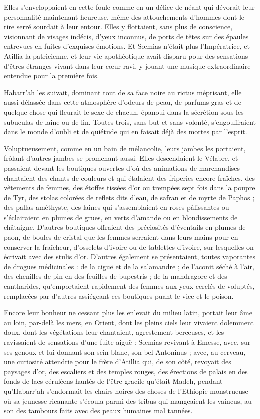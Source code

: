 \documentclass[a4paper, 11pt, oneside, polutonikogreek, french]{article}
\begin{document}
Elles s'enveloppaient en cette foule comme en un délice de néant qui dévorait leur personnalité maintenant heureuse, même des attouchements d'hommes dont le rire serré sourdait à leur entour. Elles y flottaient, sans plus de conscience, visionnant de visages indécis, d'yeux inconnus, de ports de têtes sur des épaules entrevues en fuites d'exquises émotions. Et Sœmias n'était plus l'Impératrice, et Atillia la patricienne, et leur vie apothéotique avait disparu pour des sensations d'êtres étranges vivant dans leur cœur ravi, y jouant une musique extraordinaire entendue pour la première fois.

Habarr'ah les suivait, dominant tout de sa face noire au rictus méprisant, elle aussi délassée dans cette atmosphère d'odeurs de peau, de parfums gras et de quelque chose qui fleurait le sexe de chacun, épanoui dans la sécrétion sous les subuculas de laine ou de lin. Toutes trois, sans but et sans volonté, s'engouffraient dans le monde d'oubli et de quiétude qui en faisait déjà des mortes par l'esprit.

Voluptueusement, comme en un bain de mélancolie, leurs jambes les portaient, frôlant d'autres jambes se promenant aussi. Elles descendaient le Vélabre, et passaient devant les boutiques ouvertes d'où des animations de marchandises chantaient des chants de couleurs et qui étalaient des friperies encore fraîches, des vêtements de femmes, des étoffes tissées d'or ou trempées sept fois dans la poupre de Tyr, des stolas colorées de reflets dits d'eau, de safran et de myrte de Paphos ; des pallas améthyste, des laines qui s'assemblaient en roses pâlissantes ou s'éclairaient en plumes de grues, en verts d'amande ou en blondissements de châtaigne. D'autres boutiques offraient des préciosités d'éventails en plumes de paon, de boules de cristal que les femmes serraient dans leurs mains pour en conserver la fraîcheur, d'osselets d'ivoire ou de tablettes d'ivoire, sur lesquelles on écrivait avec des stulis d'or. D'autres également se présentaient, toutes vaporantes de drogues médicinales : de la ciguë et de la salamandre ; de l'aconit séché à l'air, des chenilles de pin en des feuilles de bupestris ; de la mandragore et des cantharides, qu'emportaient rapidement des femmes aux yeux cerclés de voluptés, remplacées par d'autres assiégeant ces boutiques puant le vice et le poison.

Encore leur bonheur ne cessant plus les enlevait du milieu latin, portait leur âme au loin, par-delà les mers, en Orient, dont les pleins ciels leur vivaient dolemment doux, dont les végétations leur chantaient, agrestement berceuses, et les ravissaient de sensations d'une fuite aiguë : Sœmias revivant à Emesse, avec, sur ses genoux et lui donnant son sein blanc, son bel Antoninus ; avec, au cerveau, une curiosité attendrie pour le frère d'Atillia qui, de son côté, revoyait des paysages d'or, des escaliers et des temples rouges, des érections de palais en des fonds de lacs céruléens hantés de l'être gracile qu'était Madeh, pendant qu'Habarr'ah s'endormait les chairs noires des choses de l'Ethiopie monstrueuse où sa jeunesse ricanante s'écoula parmi des tribus qui mangeaient les vaincus, au son des tambours faits avec des peaux humaines mal tannées.
\end{document}
